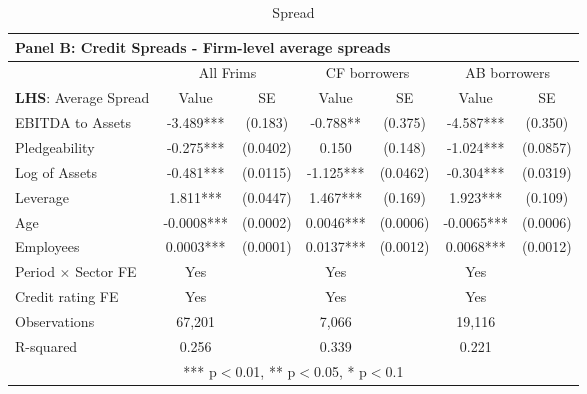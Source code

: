 \documentclass[12pt]{article}
\begin{document}
\begin{table}[H]
{\begin{tabular}{lcccccc}
    \multicolumn{7}{l}{Panel B: \textbf{Credit Spreads - Firm-level average spreads}} \\    
    \toprule
    & \multicolumn{2}{c}{All Frims} & \multicolumn{2}{c}{CF borrowers} & \multicolumn{2}{c}{AB borrowers} \\
    \cmidrule(lr){2-3} \cmidrule(lr){4-5} \cmidrule(lr){6-7}
    \textbf{LHS}: Average Spread & Value & SE & Value & SE & Value & SE \\
    \midrule
    EBITDA to Assets & -3.489*** & (0.183) & -0.788** & (0.375) & -4.587*** & (0.350) \\
    Pledgeability & -0.275*** & (0.0402) & 0.150 & (0.148) & -1.024*** & (0.0857) \\
    Log of Assets & -0.481*** & (0.0115) & -1.125*** & (0.0462) & -0.304*** & (0.0319) \\
    Leverage & 1.811*** & (0.0447) & 1.467*** & (0.169) & 1.923*** & (0.109) \\
    Age & -0.0008*** & (0.0002) & 0.0046*** & (0.0006) & -0.0065*** & (0.0006) \\
    Employees & 0.0003*** & (0.0001) & 0.0137*** & (0.0012) & 0.0068*** & (0.0012) \vspace{2mm} \\
    \midrule
    Period $\times$ Sector FE & Yes & & Yes & & Yes & \\
    Credit rating FE & Yes & & Yes & & Yes & \\
    Observations & 67,201 & & 7,066 & & 19,116 & \\
    R-squared & 0.256 & & 0.339 & & 0.221 & \\
    \bottomrule
    \multicolumn{7}{c}{*** p$<$0.01, ** p$<$0.05, * p$<$0.1} \\
    \end{tabular}%
    }
    \caption{Spread}
\end{table}
\end{document}

